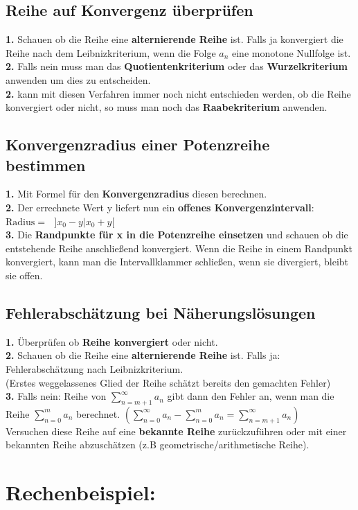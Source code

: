 \documentclass[11pt,final]{scrreprt}
\newcommand{\br} {\medskip\\}
\begin{document}
\subsection{Reihe auf Konvergenz überprüfen}
\textbf{1.} Schauen ob die Reihe eine \textbf{alternierende Reihe} ist. Falls ja konvergiert die Reihe nach dem Leibnizkriterium, wenn die Folge $a_n$ eine monotone Nullfolge ist.\br
\textbf{2.} Falls nein muss man das \textbf{Quotientenkriterium} oder das \textbf{Wurzelkriterium} anwenden um dies zu entscheiden.\br
\textbf{2.} kann mit diesen Verfahren immer noch nicht entschieden werden, ob die Reihe konvergiert oder nicht, so muss man noch das \textbf{Raabekriterium} anwenden.

\subsection{Konvergenzradius einer Potenzreihe bestimmen}
\textbf{1.} Mit Formel für den \textbf{Konvergenzradius} diesen berechnen.\br
\textbf{2.} Der errechnete Wert y liefert nun ein \textbf{offenes Konvergenzintervall}:\\
$ \text{Radius} =\text{ }] x_0-y|x_0+y [  $\br
\textbf{3.} Die \textbf{Randpunkte für x in die Potenzreihe einsetzen} und schauen ob die entstehende Reihe anschließend konvergiert. Wenn die Reihe in einem Randpunkt konvergiert, kann man die Intervallklammer schließen, wenn sie divergiert, bleibt sie offen.

\subsection{Fehlerabschätzung bei Näherungslösungen}
\textbf{1. }Überprüfen ob \textbf{Reihe konvergiert} oder nicht.\br
\textbf{2.} Schauen ob die Reihe eine \textbf{alternierende Reihe} ist. Falls ja: Fehlerabschätzung nach Leibnizkriterium.\\
(Erstes weggelassenes Glied der Reihe schätzt bereits den gemachten Fehler)\br
\textbf{3. }Falls nein: Reihe von $\sum\limits_{n=m+1}^\infty a_n$ gibt dann den Fehler an, wenn man die Reihe $\sum\limits_{n=0}^m a_n$ berechnet. $ \left( \sum\limits_{n=0}^\infty a_n - \sum\limits_{n=0}^m a_n = \sum\limits_{n=m+1}^\infty a_n \right) $\\
Versuchen diese Reihe auf eine \textbf{bekannte Reihe} zurückzuführen oder mit einer bekannten Reihe abzuschätzen (z.B geometrische/arithmetische Reihe).

\section{Rechenbeispiel:}
\end{document}
